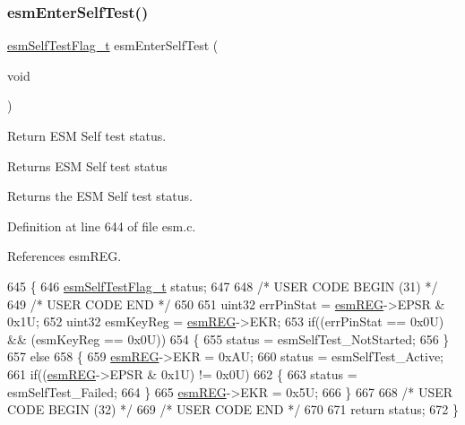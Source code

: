 \subsubsection{\texorpdfstring{esm\+Enter\+Self\+Test()}{esmEnterSelfTest()}}
{\footnotesize\ttfamily \mbox{\hyperlink{esm_8h_a622c861bffa9a22dacbc62fe8a2ff11f}{esm\+Self\+Test\+Flag\+\_\+t}} esm\+Enter\+Self\+Test (\begin{DoxyParamCaption}\item[{void}]{ }\end{DoxyParamCaption})}



Return E\+SM Self test status. 

\begin{DoxyReturn}{Returns}
E\+SM Self test status
\end{DoxyReturn}
Returns the E\+SM Self test status. 

Definition at line 644 of file esm.\+c.



References esm\+R\+EG.


\begin{DoxyCode}
645 \{
646     \mbox{\hyperlink{esm_8h_a622c861bffa9a22dacbc62fe8a2ff11f}{esmSelfTestFlag\_t}} status;
647 
648 \textcolor{comment}{/* USER CODE BEGIN (31) */}
649 \textcolor{comment}{/* USER CODE END */}
650 
651     uint32 errPinStat = \mbox{\hyperlink{reg__esm_8h_a7c2e779f2973e0c2c9496a4796df10f1}{esmREG}}->EPSR & 0x1U;
652     uint32 esmKeyReg  = \mbox{\hyperlink{reg__esm_8h_a7c2e779f2973e0c2c9496a4796df10f1}{esmREG}}->EKR;
653     \textcolor{keywordflow}{if}((errPinStat == 0x0U) && (esmKeyReg == 0x0U))
654     \{
655       status = esmSelfTest\_NotStarted;
656     \}
657     \textcolor{keywordflow}{else}
658     \{
659       \mbox{\hyperlink{reg__esm_8h_a7c2e779f2973e0c2c9496a4796df10f1}{esmREG}}->EKR = 0xAU;
660       status = esmSelfTest\_Active;
661       \textcolor{keywordflow}{if}((\mbox{\hyperlink{reg__esm_8h_a7c2e779f2973e0c2c9496a4796df10f1}{esmREG}}->EPSR & 0x1U) != 0x0U)
662       \{
663         status = esmSelfTest\_Failed;
664       \}
665       \mbox{\hyperlink{reg__esm_8h_a7c2e779f2973e0c2c9496a4796df10f1}{esmREG}}->EKR = 0x5U;
666     \}
667 
668 \textcolor{comment}{/* USER CODE BEGIN (32) */}
669 \textcolor{comment}{/* USER CODE END */}
670 
671     \textcolor{keywordflow}{return} status;
672 \}
\end{DoxyCode}
\mbox{\label{group__ESM_gaf9c1cb3cf58b215f603e7ada115deffb}} 
